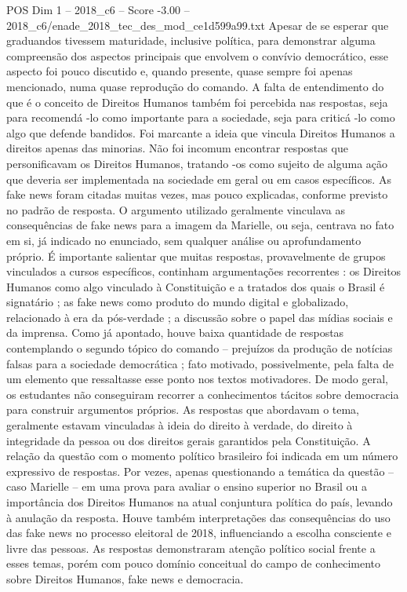 \begin{textsample}{POS Dim 1 – 2018\_c6 – Score -3.00 – 2018\_c6/enade\_2018\_tec\_des\_mod\_ce1d599a99.txt}
Apesar de se esperar que graduandos tivessem maturidade, inclusive política, para demonstrar alguma compreensão dos aspectos principais que envolvem o convívio democrático, esse aspecto foi pouco discutido e, quando presente, quase sempre foi apenas mencionado, numa quase reprodução do comando.
A falta de entendimento do que é o conceito de Direitos Humanos também foi percebida nas respostas, seja para recomendá -lo como importante para a sociedade, seja para criticá -lo como algo que defende bandidos.
Foi marcante a ideia que vincula Direitos Humanos a direitos apenas das minorias.
Não foi incomum encontrar respostas que personificavam os Direitos Humanos, tratando -os como sujeito de alguma ação que deveria ser implementada na sociedade em geral ou em casos específicos.
As fake news foram citadas muitas vezes, mas pouco explicadas, conforme previsto no padrão de resposta.
O argumento utilizado geralmente vinculava as consequências de fake news para a imagem da Marielle, ou seja, centrava no fato em si, já indicado no enunciado, sem qualquer análise ou aprofundamento próprio.
É importante salientar que muitas respostas, provavelmente de grupos vinculados a cursos específicos, continham argumentações recorrentes : os Direitos Humanos como algo vinculado à Constituição e a tratados dos quais o Brasil é signatário ; as fake news como produto do mundo digital e globalizado, relacionado à era da pós-verdade ; a discussão sobre o papel das mídias sociais e da imprensa.
Como já apontado, houve baixa quantidade de respostas contemplando o segundo tópico do comando – prejuízos da produção de notícias falsas para a sociedade democrática ; fato motivado, possivelmente, pela falta de um elemento que ressaltasse esse ponto nos textos motivadores.
De modo geral, os estudantes não conseguiram recorrer a conhecimentos tácitos sobre democracia para construir argumentos próprios.
As respostas que abordavam o tema, geralmente estavam vinculadas à ideia do direito à verdade, do direito à integridade da pessoa ou dos direitos gerais garantidos pela Constituição.
A relação da questão com o momento político brasileiro foi indicada em um número expressivo de respostas.
Por vezes, apenas questionando a temática da questão – caso Marielle – em uma prova para avaliar o ensino superior no Brasil ou a importância dos Direitos Humanos na atual conjuntura política do país, levando à anulação da resposta.
Houve também interpretações das consequências do uso das fake news no processo eleitoral de 2018, influenciando a escolha consciente e livre das pessoas.
As respostas demonstraram atenção político social frente a esses temas, porém com pouco domínio conceitual do campo de conhecimento sobre Direitos Humanos, fake news e democracia.

\end{textsample}
